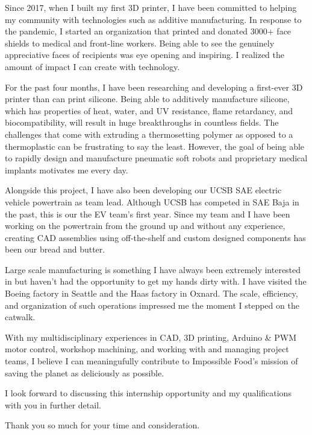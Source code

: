 \documentclass[11pt, letterpaper]{awesome-cv} %
\begin{document}
\makecvheader %

\makelettertitle %


\begin{cvletter}


Since 2017, when I built my first 3D printer, I have been committed to helping my community with technologies such as additive manufacturing. In response to the pandemic, I started an organization that printed and donated 3000+ face shields to medical and front-line workers. Being able to see the genuinely appreciative faces of recipients was eye opening and inspiring. I realized the amount of impact I can create with technology.

For the past four months, I have been researching and developing a first-ever 3D printer than can print silicone. Being able to additively manufacture silicone, which has properties of heat, water, and UV resistance, flame retardancy, and biocompatibility, will result in huge breakthroughs in countless fields. The challenges that come with extruding a thermosetting polymer as opposed to a thermoplastic can be frustrating to say the least. However, the goal of being able to rapidly design and manufacture pneumatic soft robots and proprietary medical implants motivates me every day. 

Alongside this project, I have also been developing our UCSB SAE electric vehicle powertrain as team lead. Although UCSB has competed in SAE Baja in the past, this is our the EV team's first year. Since my team and I have been working on the powertrain from the ground up and without any experience, creating CAD assemblies using off-the-shelf and custom designed components has been our bread and butter.

Large scale manufacturing is something I have always been extremely interested in but haven't had the opportunity to get my hands dirty with. I have visited the Boeing factory in Seattle and the Haas factory in Oxnard. The scale, efficiency, and organization of such operations impressed me the moment I stepped on the catwalk. 

With my multidisciplinary experiences in CAD, 3D printing, Arduino \& PWM motor control, workshop machining, and working with and managing project teams, I believe I can meaningufully contribute to Impossible Food's mission of saving the planet as deliciously as possible. 

I look forward to discussing this internship opportunity and my qualifications with you in further detail.

Thank you so much for your time and consideration.


\end{cvletter}


\makeletterclosing %
\end{document}
